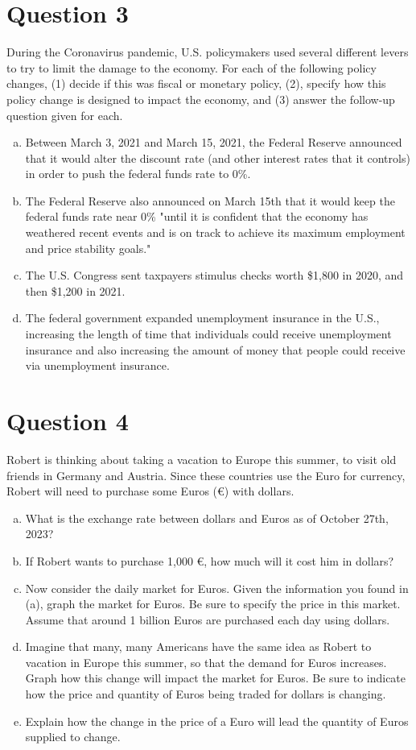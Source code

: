 \documentclass{article}
\newcommand{\question}[1]{\pagebreak\section{Question #1}}
\begin{document}
\pagebreak

\question{3}
During the Coronavirus pandemic, U.S. policymakers used several different levers to try to limit the damage to the economy. For each of
the following policy changes, (1) decide if this was fiscal or monetary
policy, (2), specify how this policy change is designed to impact the
economy, and (3) answer the follow-up question given for each.

\begin{enumerate}[(a)]
    \item Between March 3, 2021 and March 15, 2021, the Federal Reserve announced that it would alter the discount rate (and other interest rates that it controls) in order to push the federal funds rate to 0\%.
    \item The Federal Reserve also announced on March 15th that it would keep the federal funds rate near 0\% "until it is confident that the economy has weathered recent events and is on track to achieve its maximum employment and price stability goals."
    \item The U.S. Congress sent taxpayers stimulus checks worth \$1,800 in 2020, and then \$1,200 in 2021.
    \item The federal government expanded unemployment insurance in the U.S., increasing the length of time that individuals could receive unemployment insurance and also increasing the amount of money that people could receive via unemployment insurance.
\end{enumerate}

\pagebreak

\question{4}

Robert is thinking about taking a vacation to Europe this summer, to
visit old friends in Germany and Austria. Since these countries use
the Euro for currency, Robert will need to purchase some Euros (€)
with dollars.

\begin{enumerate}[(a)]
    \item What is the exchange rate between dollars and Euros as of October 27th, 2023?
    \item If Robert wants to purchase 1,000 €, how much will it cost him in dollars?
    \item Now consider the daily market for Euros. Given the information you found in (a), graph the market for Euros. Be sure to specify the price in this market. Assume that around 1 billion Euros are purchased each day using dollars.
    \item Imagine that many, many Americans have the same idea as Robert to vacation in Europe this summer, so that the demand for Euros increases. Graph how this change will impact the market for Euros. Be sure to indicate how the price and quantity of Euros being traded for dollars is changing.
    \item Explain how the change in the price of a Euro will lead the quantity of Euros supplied to change.
\end{enumerate}
\end{document}
